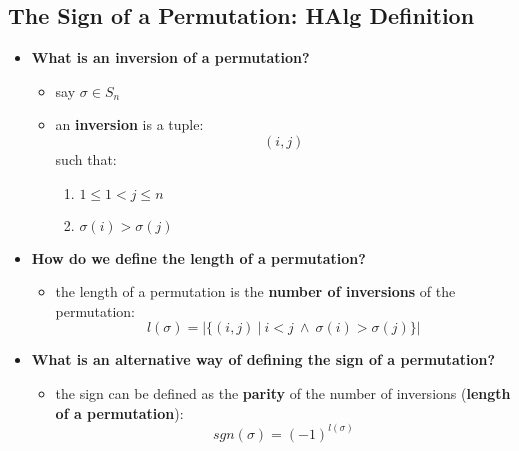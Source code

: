\documentclass{exam}
\begin{document}
\subsection{The Sign of a Permutation: HAlg Definition}

\begin{itemize}
    \item \textbf{What is an inversion of a permutation?}
    \begin{itemize}
        \item say $\sigma \in S_n$
        \item an \textbf{inversion} is a tuple:
        \[
        (i,j) 
        \]
        such that:
        \begin{enumerate}
            \item $1 \leq 1 < j \leq n$
            \item $\sigma(i) > \sigma(j)$
        \end{enumerate}
    \end{itemize}
    \item \textbf{How do we define the length of a permutation?}
    \begin{itemize}
        \item the length of a permutation is the \textbf{number of inversions} of the permutation:
        \[
        l(\sigma) = |\{(i,j) \ | \ i < j \ \wedge \ \sigma(i) > \sigma(j)\}|
        \]
    \end{itemize}
    \item \textbf{What is an alternative way of defining the sign of a permutation?}
    \begin{itemize}
        \item the sign can be defined as the \textbf{parity} of the number of inversions (\textbf{length of a permutation}):
        \[
        sgn(\sigma) = (-1)^{l(\sigma)}
        \]
    \end{itemize}
\end{itemize}
\end{document}
